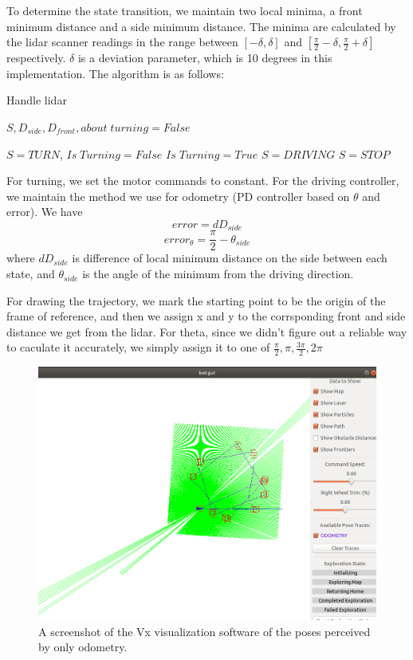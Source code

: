 \documentclass[conference]{IEEEtran}
\begin{document}
To determine the state transition, we maintain two local minima, a front minimum distance and a side minimum distance. The minima are calculated by the lidar scanner readings in the range between $[-\delta, \delta]$ and $[\frac{\pi}{2} -\delta,\frac{\pi}{2} + \delta] $ respectively. $\delta$ is a deviation parameter, which is 10 degrees in this implementation. The algorithm is as follows:

\begin{algorithm}[H]
	\caption{Handle lidar}
	\begin{algorithmic}
		\STATE $S, D_{side}, D_{front}, about \; turning = False$
		
		
		\STATE $S = TURN$, $Is \; Turning = False$
		\ENDIF
		\STATE $Is \; Turning = True$
		\ENDIF
		\STATE $S = DRIVING$
		\ENDIF
		\ELSE
		\STATE $S = STOP$
		\ENDIF
	\end{algorithmic}
\end{algorithm}

For turning, we set the motor commands to constant. For the driving controller, we maintain the method we use for odometry (PD controller based on $\theta$ and error). We have 
$$
error = dD_{side}
$$
$$
error_{\theta} = \frac{\pi}{2} - \theta_{side}
$$
where $dD_{side}$ is difference of local minimum distance on the side between each state, and $\theta_{side}$ is the angle of the minimum from the driving direction.

For drawing the trajectory, we mark the starting point to be the origin of the frame of reference, and then we assign x and y to the corrsponding front and side distance we get from the lidar.
For theta, since we didn't figure out a reliable way to caculate it accurately, we simply assign it to one of $\frac{\pi}{2},\pi,\frac{3\pi}{2},2\pi$

\begin{figure}
	\includegraphics[width=\linewidth]{task6_1.png}
	\caption{A screenshot of the Vx visualization software of the poses perceived by only odometry.}
	\label{fig:task6_1}
\end{figure}
\end{document}
